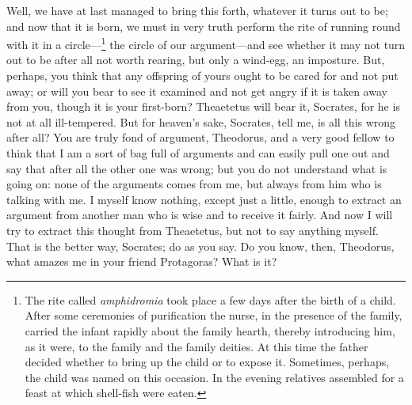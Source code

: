 \documentclass[letterpaper,12pt]{article}
\newcommand{\stephpag}[1]{\marginnote{\small\itshape\fontfamily{ppl}\selectfont #1}}
\begin{document}
\begin{drama}
Well, we have at last managed to bring this forth, whatever it turns out to be; and now that it is born, we must in very truth perform the rite of running round with it in a circle—\footnote{The rite called \emph{amphidromia} took place a few days after the birth of a child. After some ceremonies of purification the nurse, in the presence of the family, carried the infant rapidly about the family hearth, thereby introducing him, as it were, to the family and the family deities. At this time the father decided whether to bring up the child or to expose it. Sometimes, perhaps, the child was named on this occasion. In the evening relatives assembled for a feast at which shell-fish were eaten.} the circle of our argument—and see whether it may not turn out to be after all not worth rearing, but only a wind-egg, \stephpag{161 a} an imposture. But, perhaps, you think that any offspring of yours ought to be cared for and not put away; or will you bear to see it examined and not get angry if it is taken away from you, though it is your first-born?
\theodorusspeaks
Theaetetus will bear it, Socrates, for he is not at all ill-tempered. But for heaven's sake, Socrates, tell me, is all this wrong after all?
\socratesspeaks
You are truly fond of argument, Theodorus, and a very good fellow to think that I am a sort of bag full of arguments and can easily pull one out and say that after all the other one was wrong; \stephpag{b} but you do not understand what is going on: none of the arguments comes from me, but always from him who is talking with me. I myself know nothing, except just a little, enough to extract an argument from another man who is wise and to receive it fairly. And now I will try to extract this thought from Theaetetus, but not to say anything myself.
\theodorusspeaks
That is the better way, Socrates; do as you say.
\socratesspeaks
Do you know, then, Theodorus, what amazes me in your friend Protagoras? \stephpag{c}
\theodorusspeaks
What is it?
\socratesspeaks

\end{drama}
\end{document}
